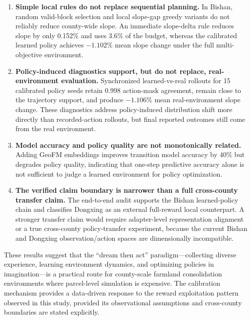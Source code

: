 \documentclass[11pt]{article}
\begin{document}
\begin{enumerate}
\item \textbf{Simple local rules do not replace sequential planning.} In Bishan, random valid-block selection and local slope-gap greedy variants do not reliably reduce county-wide slope. An immediate slope-delta rule reduces slope by only 0.152\% and uses 3.6\% of the budget, whereas the calibrated learned policy achieves $-1.102\%$ mean slope change under the full multi-objective environment.

\item \textbf{Policy-induced diagnostics support, but do not replace, real-environment evaluation.} Synchronized learned-vs-real rollouts for 15 calibrated policy seeds retain 0.998 action-mask agreement, remain close to the trajectory support, and produce $-1.106\%$ mean real-environment slope change. These diagnostics address policy-induced distribution shift more directly than recorded-action rollouts, but final reported outcomes still come from the real environment.

\item \textbf{Model accuracy and policy quality are not monotonically related.} Adding GeoFM embeddings improves transition model accuracy by 40\% but degrades policy quality, indicating that one-step predictive accuracy alone is not sufficient to judge a learned environment for policy optimization.

\item \textbf{The verified claim boundary is narrower than a full cross-county transfer claim.} The end-to-end audit supports the Bishan learned-policy chain and classifies Dongxing as an external full-reward local counterpart. A stronger transfer claim would require adapter-level representation alignment or a true cross-county policy-transfer experiment, because the current Bishan and Dongxing observation/action spaces are dimensionally incompatible.
\end{enumerate}

These results suggest that the ``dream then act'' paradigm---collecting diverse experience, learning environment dynamics, and optimizing policies in imagination---is a practical route for county-scale farmland consolidation environments where parcel-level simulation is expensive. The calibration mechanism provides a data-driven response to the reward exploitation pattern observed in this study, provided its observational assumptions and cross-county boundaries are stated explicitly.


\end{document}
